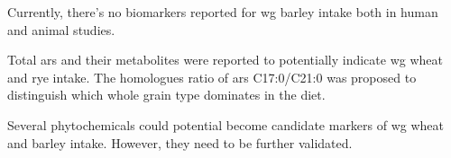 Currently, there's no biomarkers reported for \acrshort{wg} barley intake both in human and animal studies.

Total \acrshort{ars} and their metabolites were reported to potentially indicate \acrshort{wg} wheat and rye intake. The homologues ratio of \acrshort{ars} C17:0/C21:0 was proposed to distinguish which whole grain type dominates in the diet.

Several phytochemicals could potential become candidate markers of \acrshort{wg} wheat and barley intake. However, they need to be further validated.